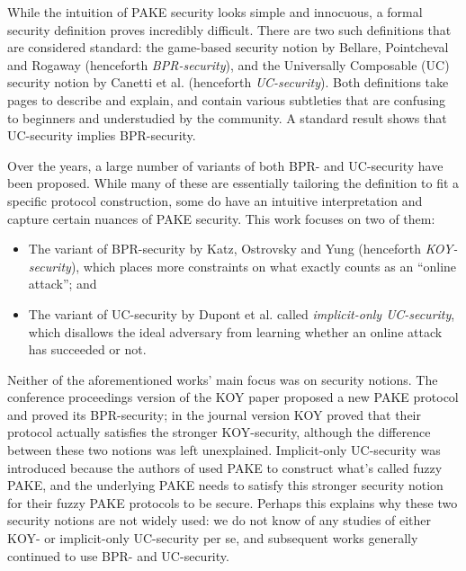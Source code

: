 \documentclass{article}
\begin{document}
While the intuition of PAKE security looks simple and innocuous, a formal security definition proves incredibly difficult. There are two such definitions that are considered standard: the game-based security notion by Bellare, Pointcheval and Rogaway \cite{EC:BelPoiRog00} (henceforth \emph{BPR-security}), and the Universally Composable (UC) security notion by Canetti et al. \cite{EC:CHKLM05} (henceforth \emph{UC-security}). Both definitions take pages to describe and explain, and contain various subtleties that are confusing to beginners and understudied by the community. A standard result \cite[Appendix~A]{EC:CHKLM05} shows that UC-security implies BPR-security.

Over the years, a large number of variants of both BPR- and UC-security have been proposed. While many of these are essentially tailoring the definition to fit a specific protocol construction, some do have an intuitive interpretation and capture certain nuances of PAKE security. This work focuses on two of them:
\begin{itemize}
  \item The variant of BPR-security by Katz, Ostrovsky and Yung \cite{JACM:KatOstYun09} (henceforth \emph{KOY-security}), which places more constraints on what exactly counts as an ``online attack''; and
  \item The variant of UC-security by Dupont et al. \cite{EC:DHPRY18} called \emph{implicit-only UC-security}, which disallows the ideal adversary from learning whether an online attack has succeeded or not.
\end{itemize}
Neither of the aforementioned works' main focus was on security notions. The conference proceedings version of the KOY paper \cite{EC:KatOstYun01} proposed a new PAKE protocol and proved its BPR-security; in the journal version \cite{JACM:KatOstYun09} KOY proved that their protocol actually satisfies the stronger KOY-security, although the difference between these two notions was left unexplained. Implicit-only UC-security was introduced because the authors of \cite{EC:DHPRY18} used PAKE to construct what's called fuzzy PAKE, and the underlying PAKE needs to satisfy this stronger security notion for their fuzzy PAKE protocols to be secure. Perhaps this explains why these two security notions are not widely used: we do not know of any studies of either KOY- or implicit-only UC-security per se, and subsequent works generally continued to use BPR- and UC-security.
\end{document}
